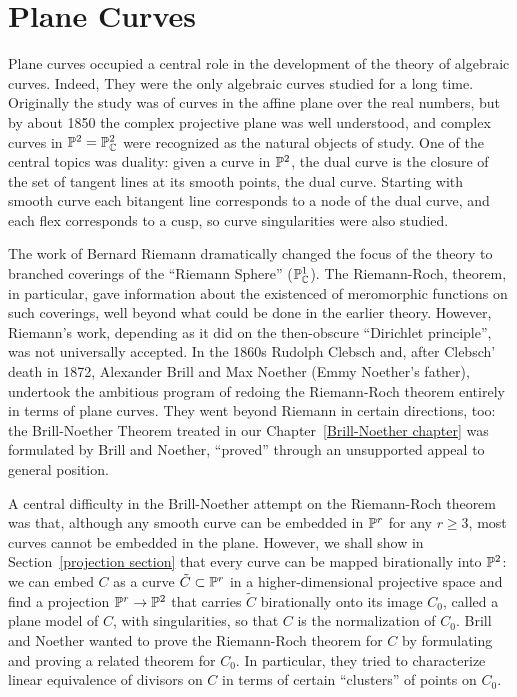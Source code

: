 

\chapter{Plane Curves}
\label{PlaneCurvesChapter}

Plane curves occupied a central role in the development of the theory of algebraic curves. Indeed, They were the only algebraic curves studied for a long time. Originally the study was of curves in the affine plane over the real numbers, but by about 1850 the complex projective plane was well understood, and complex curves in ${\mathbb P}^2 = {\mathbb P}^2_{\mathbb C}$ were recognized as the natural objects of study. One of the central topics was duality: given a curve in ${\mathbb P}^2$, the dual curve is the closure of the set of tangent lines at its smooth points, the dual curve. Starting with smooth curve each bitangent line corresponds to a node of the dual curve, and each flex corresponds to a cusp, so curve singularities were also studied.

The work of Bernard Riemann dramatically changed the focus of the theory to branched coverings of   the ``Riemann Sphere'' (${\mathbb P}^1_{\mathbb C}$). The Riemann-Roch, theorem, in particular, gave information about the existenced of meromorphic functions on such coverings, well beyond what could be done in the earlier theory. However, Riemann's work, depending as it did on the then-obscure ``Dirichlet principle'', was not universally accepted. In the 1860s Rudolph Clebsch and, after Clebsch' death in 1872, Alexander Brill and Max Noether (Emmy Noether's father), undertook the ambitious program of redoing the Riemann-Roch theorem entirely in terms of plane curves. They went beyond Riemann in certain directions, too: the Brill-Noether Theorem treated in our Chapter~\ref{Brill-Noether chapter} was formulated by Brill and Noether, ``proved'' through an unsupported appeal to general position. 

A central difficulty in the Brill-Noether attempt on the Riemann-Roch theorem was that,
although any smooth curve can be embedded in ${\mathbb P}^r$ for any $r \geq 3$, most curves cannot be embedded in the plane. 
However, we shall show in Section~\ref{projection section} that every curve can be mapped birationally into ${\mathbb P}^2$: we can embed $C$ as a curve $\tilde C \subset {\mathbb P}^r$ in a higher-dimensional projective space and find a projection ${\mathbb P}^r \to {\mathbb P}^2$ that carries $\tilde C$ birationally onto its image $C_0$, called a plane model of $C$, with singularities, so that $C$ is the normalization of $C_0$. Brill and Noether wanted to prove the Riemann-Roch theorem for $C$ by formulating and proving a related theorem for $C_0$. In particular, they tried to characterize linear equivalence of divisors on $C$ in terms of certain ``clusters'' of points on $C_0$. 


